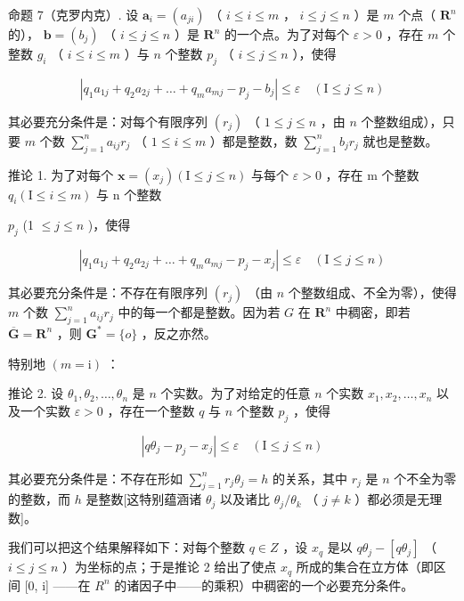 命题 7（克罗内克）. 设 \(\boldsymbol{a}_i = (a_{ji})\) （ \(i \leqslant i \leqslant m\) ， \(i \leqslant j \leqslant n\) ）是 \(m\) 个点（ \(\mathbf{R}^n\) 的）， \(\boldsymbol{b} = (b_j)\) （ \(i \leqslant j \leqslant n\) ）是 \(\mathbf{R}^n\) 的一个点。为了对每个 \(\varepsilon > 0\) ，存在 \(m\) 个整数 \(g_i\) （ \(i \leqslant i \leqslant m\) ）与 \(n\) 个整数 \(p_j\) （ \(i \leqslant j \leqslant n\) ），使得

\[
\left| q _ {1} a _ {1 j} + q _ {2} a _ {2 j} + \dots + q _ {m} a _ {m j} - p _ {j} - b _ {j} \right| \leqslant \varepsilon \quad (\mathrm{I} \leqslant j \leqslant n)
\]

其必要充分条件是：对每个有限序列 \((r_j)\) （ \(1 \leqslant j \leqslant n\) ，由 \(n\) 个整数组成），只要 \(m\) 个数 \(\sum_{j=1}^{n} a_{ij} r_j\) （ \(1 \leqslant i \leqslant m\) ）都是整数，数 \(\sum_{j=1}^{n} b_j r_j\) 就也是整数。

推论 1. 为了对每个 \(\boldsymbol{x} = (x_{j}) (\mathrm{I} \leqslant j \leqslant n)\) 与每个 \(\varepsilon > 0\) ，存在 m 个整数 \(q_{i} (\mathrm{I} \leqslant i \leqslant m)\) 与 n 个整数

\(p_j\) (1 \(\leqslant j\leqslant n\) )，使得

\[
\left| q _ {1} a _ {1 j} + q _ {2} a _ {2 j} + \dots + q _ {m} a _ {m j} - p _ {j} - x _ {j} \right| \leqslant \varepsilon \quad (\mathrm{I} \leqslant j \leqslant n)
\]

其必要充分条件是：不存在有限序列 \((r_j)\) （由 \(n\) 个整数组成、不全为零），使得 \(m\) 个数 \(\sum_{j=1}^{n} a_{ij} r_j\) 中的每一个都是整数。因为若 \(G\) 在 \(\mathbf{R}^n\) 中稠密，即若 \(\overline{\mathbf{G}} = \mathbf{R}^n\) ，则 \(\mathbf{G}^* = \{o\}\) ，反之亦然。

特别地 \((m = \mathrm{i})\) ：

推论 2. 设 \(\theta_{1},\theta_{2},\ldots ,\theta_{n}\) 是 \(n\) 个实数。为了对给定的任意 \(n\) 个实数 \(x_{1},x_{2},\ldots ,x_{n}\) 以及一个实数 \(\varepsilon >0\) ，存在一个整数 \(q\) 与 \(n\) 个整数 \(p_j\) ，使得

\[
\left| q \theta_ {j} - p _ {j} - x _ {j} \right| \leqslant \varepsilon \quad (\mathrm{I} \leqslant j \leqslant n)
\]

其必要充分条件是：不存在形如 \(\sum_{j=1}^{n} r_j \theta_j = h\) 的关系，其中 \(r_j\) 是 \(n\) 个不全为零的整数，而 \(h\) 是整数{[}这特别蕴涵诸 \(\theta_j\) 以及诸比 \(\theta_j / \theta_k\) （ \(j \neq k\) ）都必须是无理数{]}。

我们可以把这个结果解释如下：对每个整数 \(q \in Z\) ，设 \(x_{q}\) 是以 \(q\theta_{j} - [q\theta_{j}]\) （ \(i \leqslant j \leqslant n\) ）为坐标的点；于是推论 2 给出了使点 \(x_{q}\) 所成的集合在立方体（即区间 {[}0, i{]} ——在 \(R^{n}\) 的诸因子中——的乘积）中稠密的一个必要充分条件。

